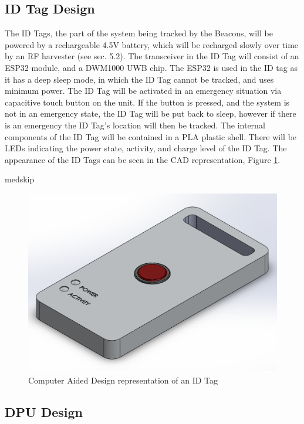 \pagebreak
\subsection{ID Tag Design}
The ID Tags, the part of the system being tracked by the Beacons, will be powered by a rechargeable 4.5V battery, which will be recharged slowly over time by an RF harvester (see sec. 5.2). The transceiver in the ID Tag will consist of an ESP32 module, and a DWM1000 UWB chip. The ESP32 is used in the ID tag as it has a deep sleep mode, in which the ID Tag cannot be tracked, and uses minimum power. The ID Tag will be activated in an emergency situation via capacitive touch button on the unit. If the button is pressed, and the system is not in an emergency state, the ID Tag will be put back to sleep, however if there is an emergency the ID Tag's location will then be tracked. The internal components of the ID Tag will be contained in a PLA plastic shell. There will be LEDs indicating the power state, activity, and charge level of the ID Tag. The appearance of the ID Tags can be seen in the CAD representation, Figure \ref{ID_Tag}.

medskip
\begin{figure}[H]
\centering
    \includegraphics[scale=0.55]{./images/ID_Tag.png}
    \caption{Computer Aided Design representation of an ID Tag}
    \label{ID_Tag}
\end{figure}


\pagebreak
\subsection{DPU Design}





